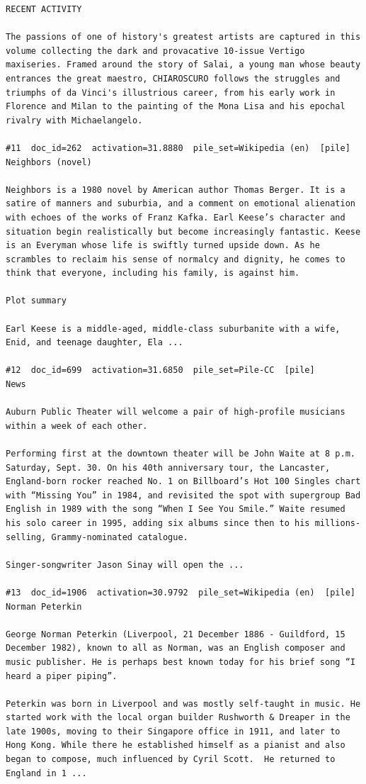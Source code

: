 \begin{verbatim}
RECENT ACTIVITY

The passions of one of history's greatest artists are captured in this volume collecting the dark and provacative 10-issue Vertigo maxiseries. Framed around the story of Salai, a young man whose beauty entrances the great maestro, CHIAROSCURO follows the struggles and triumphs of da Vinci's illustrious career, from his early work in Florence and Milan to the painting of the Mona Lisa and his epochal rivalry with Michaelangelo.

#11  doc_id=262  activation=31.8880  pile_set=Wikipedia (en)  [pile]
Neighbors (novel)

Neighbors is a 1980 novel by American author Thomas Berger. It is a satire of manners and suburbia, and a comment on emotional alienation with echoes of the works of Franz Kafka. Earl Keese’s character and situation begin realistically but become increasingly fantastic. Keese is an Everyman whose life is swiftly turned upside down. As he scrambles to reclaim his sense of normalcy and dignity, he comes to think that everyone, including his family, is against him.

Plot summary 

Earl Keese is a middle-aged, middle-class suburbanite with a wife, Enid, and teenage daughter, Ela ...

#12  doc_id=699  activation=31.6850  pile_set=Pile-CC  [pile]
News

Auburn Public Theater will welcome a pair of high-profile musicians within a week of each other.

Performing first at the downtown theater will be John Waite at 8 p.m. Saturday, Sept. 30. On his 40th anniversary tour, the Lancaster, England-born rocker reached No. 1 on Billboard’s Hot 100 Singles chart with “Missing You” in 1984, and revisited the spot with supergroup Bad English in 1989 with the song “When I See You Smile.” Waite resumed his solo career in 1995, adding six albums since then to his millions-selling, Grammy-nominated catalogue.

Singer-songwriter Jason Sinay will open the ...

#13  doc_id=1906  activation=30.9792  pile_set=Wikipedia (en)  [pile]
Norman Peterkin

George Norman Peterkin (Liverpool, 21 December 1886 - Guildford, 15 December 1982), known to all as Norman, was an English composer and music publisher. He is perhaps best known today for his brief song “I heard a piper piping”.

Peterkin was born in Liverpool and was mostly self-taught in music. He started work with the local organ builder Rushworth & Dreaper in the late 1900s, moving to their Singapore office in 1911, and later to Hong Kong. While there he established himself as a pianist and also began to compose, much influenced by Cyril Scott.  He returned to England in 1 ...


\end{verbatim}
